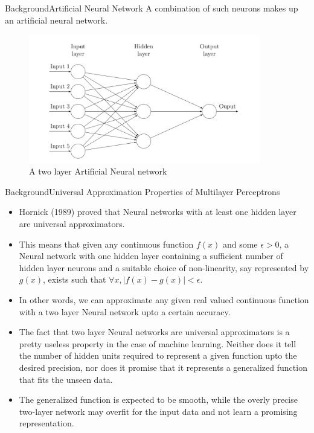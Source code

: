 \documentclass[9pt, unknownkeysallowed]{beamer}
\begin{document}
\begin{frame}{Background}{Artificial Neural Network}
 A combination of such neurons makes up an artificial neural network.
 \begin{figure}[H]
\includegraphics[width=0.9\textwidth]{../img/ann.png}
\caption{A two layer Artificial Neural network}
\end{figure}
\end{frame}

\begin{frame}{Background}{Universal Approximation Properties of Multilayer Perceptrons}
\begin{itemize}
 \item Hornick (1989) proved that 
Neural networks with at least one hidden layer are universal 
approximators.
\item This means that given any continuous 
function $f(x)$ and some $\epsilon>0$, a Neural network with one hidden layer 
containing a sufficient number of hidden layer neurons and a suitable choice of 
non-linearity, say represented by $g(x)$, exists such that $\forall x, 
|f(x)-g(x)|<\epsilon$.
\item In other words, we can approximate any given real 
valued continuous function with a two layer Neural network upto a certain 
accuracy.
\item The fact that two layer Neural networks are universal approximators 
is a pretty useless property in the case of machine learning. Neither does it 
tell the number of hidden units required to represent a given function upto the 
desired precision, nor does it promise that it represents a generalized 
function that fits the unseen data. 
\item The generalized function is expected to be smooth, 
while the overly precise two-layer network may overfit for the input data and 
not learn a promising representation.
\end{itemize}
\end{frame}
\end{document}
